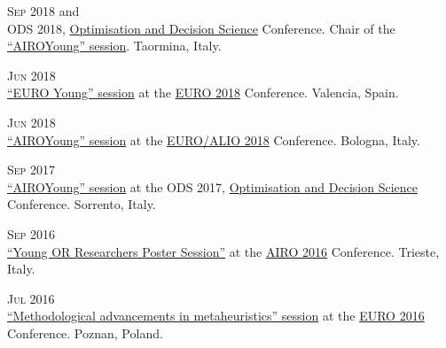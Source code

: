 \begin{paracol}{2}
  \textsc{Sep 2018}
\switchcolumn
   and \\
  ODS 2018, \href{http://web.archive.org/web/20180923151224/http://www.airoconference.it/ods2018/committee}{Optimisation and Decision Science} Conference. Chair of the \href{https://santini.in/files/cv/ods18-prog.pdf}{``AIROYoung'' session}.
  Taormina, Italy.
\end{paracol}

\begin{paracol}{2}
  \textsc{Jun 2018}
\switchcolumn
  \\
  \href{https://santini.in/files/cv/euro18-prog.pdf}{``EURO Young'' session} at the \href{http://web.archive.org/web/20180923151458/http://euro2018valencia.com/}{EURO 2018} Conference.
  Valencia, Spain.
\end{paracol}

\begin{paracol}{2}
  \textsc{Jun 2018}
\switchcolumn
  \\
  \href{https://santini.in/files/cv/euroalio18-prog.pdf}{``AIROYoung'' session} at the \href{http://web.archive.org/web/20180923151741/https://events.unibo.it/euroalio2018}{EURO/ALIO 2018} Conference.
  Bologna, Italy.
\end{paracol}

\begin{paracol}{2}
  \textsc{Sep 2017}
\switchcolumn
  \\
  \href{https://santini.in/files/cv/ods17-prog.pdf}{``AIROYoung'' session} at the ODS 2017, \href{http://web.archive.org/web/20180219031743/http://www.airoconference.it/ods2017/}{Optimisation and Decision Science} Conference.
  Sorrento, Italy.
\end{paracol}

\begin{paracol}{2}
  \textsc{Sep 2016}
\switchcolumn
  \\
  \href{https://santini.in/files/cv/airo16-prog.pdf}{``Young OR Researchers Poster Session''} at the \href{http://web.archive.org/web/20161031094953/http://www.airo.org/conferences/airo2016/}{AIRO 2016} Conference.
  Trieste, Italy.
\end{paracol}

\begin{paracol}{2}
  \textsc{Jul 2016}
\switchcolumn
  \\
  \href{https://santini.in/files/cv/euro16-prog.pdf}{``Methodological advancements in metaheuristics'' session} at the \href{http://web.archive.org/web/20180923153214/https://euro2016.euro-online.org/}{EURO 2016} Conference.
  Poznan, Poland.
\end{paracol}


